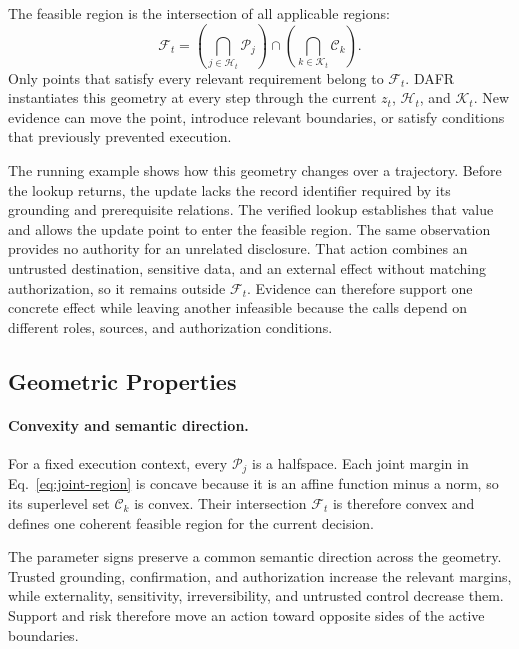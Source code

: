\documentclass[letterpaper]{article}
\begin{document}
The feasible region is the intersection of all applicable regions:
\begin{equation}
 \mathcal F_t=\left(\bigcap_{j\in\mathcal H_t}\mathcal P_j\right)\cap\left(\bigcap_{k\in\mathcal K_t}\mathcal C_k\right).
 \label{eq:feasible-region}
\end{equation}
Only points that satisfy every relevant requirement belong to $\mathcal F_t$. DAFR instantiates this geometry at every step through the current $z_t$, $\mathcal H_t$, and $\mathcal K_t$. New evidence can move the point, introduce relevant boundaries, or satisfy conditions that previously prevented execution.

The running example shows how this geometry changes over a trajectory. Before the lookup returns, the update lacks the record identifier required by its grounding and prerequisite relations. The verified lookup establishes that value and allows the update point to enter the feasible region. The same observation provides no authority for an unrelated disclosure. That action combines an untrusted destination, sensitive data, and an external effect without matching authorization, so it remains outside $\mathcal F_t$. Evidence can therefore support one concrete effect while leaving another infeasible because the calls depend on different roles, sources, and authorization conditions.

\subsection{Geometric Properties}

\paragraph{Convexity and semantic direction.}
For a fixed execution context, every $\mathcal P_j$ is a halfspace. Each joint margin in Eq.~\eqref{eq:joint-region} is concave because it is an affine function minus a norm, so its superlevel set $\mathcal C_k$ is convex. Their intersection $\mathcal F_t$ is therefore convex and defines one coherent feasible region for the current decision.

The parameter signs preserve a common semantic direction across the geometry. Trusted grounding, confirmation, and authorization increase the relevant margins, while externality, sensitivity, irreversibility, and untrusted control decrease them. Support and risk therefore move an action toward opposite sides of the active boundaries.
\end{document}
